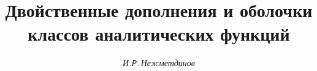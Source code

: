 




% 





\newcommand{\cm}{\operatorname{cm}}


\newcommand{\bor}{\operatorname{bor}}


\newcommand{\const}{\operatorname{const}}


\newcommand{\tts}[1]{}


\renewcommand{\baselinestretch}{0.96}







\setcounter{page}{44}















\author{\it И.Р.\,Нежметдинов}




\title{Двойственные дополнения и оболочки\\


классов аналитических функций}





\date{}




\pagestyle{plain} %







